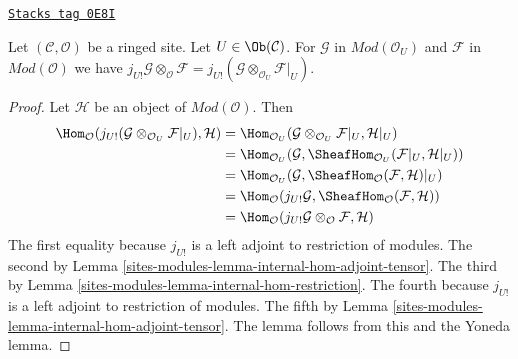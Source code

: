 \begin{lemma}
\label{sites-modules-lemma-j-shriek-and-tensor}
\href{https://stacks.math.columbia.edu/tag/0E8I}{\texttt{Stacks tag 0E8I}}

Let $(\mathcal{C}, \mathcal{O})$ be a ringed site.
Let $U \in \Ob(\mathcal{C})$.
For $\mathcal{G}$ in $\textit{Mod}(\mathcal{O}_U)$
and $\mathcal{F}$ in $\textit{Mod}(\mathcal{O})$
we have $j_{U!}\mathcal{G} \otimes_\mathcal{O} \mathcal{F} =
j_{U!}(\mathcal{G} \otimes_{\mathcal{O}_U} \mathcal{F}|_U)$.
\end{lemma}

\begin{proof}
Let $\mathcal{H}$ be an object of $\textit{Mod}(\mathcal{O})$.
Then
\begin{align*}
\Hom_\mathcal{O}(j_{U!}(\mathcal{G} \otimes_{\mathcal{O}_U} \mathcal{F}|_U),
\mathcal{H})
& =
\Hom_{\mathcal{O}_U}(\mathcal{G} \otimes_{\mathcal{O}_U} \mathcal{F}|_U,
\mathcal{H}|_U) \\
& =
\Hom_{\mathcal{O}_U}(\mathcal{G},
\SheafHom_{\mathcal{O}_U}(\mathcal{F}|_U, \mathcal{H}|_U)) \\
& =
\Hom_{\mathcal{O}_U}(\mathcal{G},
\SheafHom_\mathcal{O}(\mathcal{F}, \mathcal{H})|_U) \\
& =
\Hom_\mathcal{O}(j_{U!}\mathcal{G},
\SheafHom_\mathcal{O}(\mathcal{F}, \mathcal{H})) \\
& =
\Hom_\mathcal{O}(j_{U!}\mathcal{G} \otimes_\mathcal{O} \mathcal{F},
\mathcal{H})
\end{align*}
The first equality because $j_{U!}$ is a left adjoint to restriction
of modules.
The second by Lemma \ref{sites-modules-lemma-internal-hom-adjoint-tensor}.
The third by Lemma \ref{sites-modules-lemma-internal-hom-restriction}.
The fourth because $j_{U!}$ is a left adjoint to restriction
of modules.
The fifth by Lemma \ref{sites-modules-lemma-internal-hom-adjoint-tensor}.
The lemma follows from this and the Yoneda lemma.
\end{proof}

